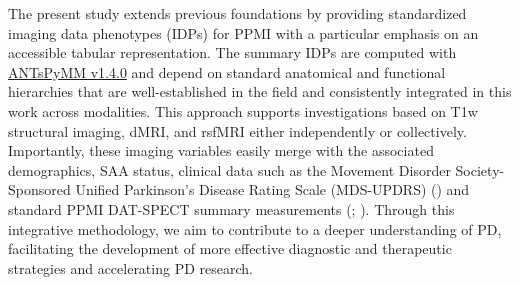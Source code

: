 \documentclass[
  table]{article}
\begin{document}
The present study extends previous foundations by providing standardized
imaging data phenotypes (IDPs) for PPMI with a particular emphasis on an
accessible tabular representation. The summary IDPs are computed with
\href{https://pypi.org/project/antspymm/}{ANTsPyMM v1.4.0} and depend on
standard anatomical and functional hierarchies that are well-established
in the field and consistently integrated in this work across modalities.
This approach supports investigations based on T1w structural imaging,
dMRI, and rsfMRI either independently or collectively. Importantly,
these imaging variables easily merge with the associated demographics,
SAA status, clinical data such as the Movement Disorder
Society-Sponsored Unified Parkinson's Disease Rating Scale (MDS-UPDRS)
() and standard PPMI
DAT-SPECT summary measurements (; ).
Through this integrative methodology, we aim to contribute to a deeper
understanding of PD, facilitating the development of more effective
diagnostic and therapeutic strategies and accelerating PD research.
\end{document}
